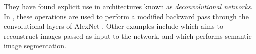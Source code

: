 \documentclass{article}[a4paper]
\begin{document}
They have found explicit use in architectures known as \textit{deconvolutional networks}. In \cite{zeiler2014visualizing}, these operations are used to perform a modified backward pass \cite{simonyan2013deep} through the convolutional layers of AlexNet \cite{krizhevsky2012imagenet}. Other examples include \cite{zeiler2010deconvolutional} which aims to reconstruct images passed as input to the network, and \cite{long2015fully} which performs semantic image segmentation.

\printbibliography
\end{document}
